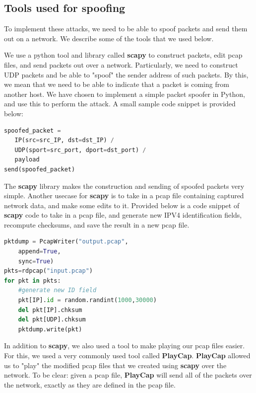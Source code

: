 \documentclass[conference]{IEEEtran}
\begin{document}
\subsection{Tools used for spoofing}
To implement these attacks, we need to be able to spoof packets and send them out on a network. We describe some of the tools that we used below.

We use a python tool and library called \textbf{scapy} to construct packets, edit pcap files, and send packets out over a network. 
Particularly, we  need to construct UDP packets and be able to "spoof" the sender address of such packets.
By this, we mean that we need to be able to indicate that a packet is coming from another host.
We have chosen to implement a simple packet spoofer in Python, and use this to perform the attack.
A small sample code snippet is provided below:
\vspace{0.3cm}
\begin{lstlisting}[language=Python]
spoofed_packet = 
   IP(src=src_IP, dst=dst_IP) / 
   UDP(sport=src_port, dport=dst_port) / 
   payload
send(spoofed_packet)
\end{lstlisting}
\vspace{0.3cm}
The \textbf{scapy} library makes the construction and sending of spoofed packets very simple.
Another usecase for \textbf{scapy} is to take in a pcap file containing captured network data, and make some edits to it.
Provided below is a code snippet of \textbf{scapy} code to take in a pcap file, and generate new IPV4 identification fields, recompute checksums, and save the result in a new pcap file.
\vspace{0.3cm}
\begin{lstlisting}[language=Python]
pktdump = PcapWriter("output.pcap",
	append=True, 
	sync=True)
pkts=rdpcap("input.pcap")
for pkt in pkts:
	#generate new ID field
	pkt[IP].id = random.randint(1000,30000)  
	del pkt[IP].chksum
	del pkt[UDP].chksum
	pktdump.write(pkt)
\end{lstlisting}
\vspace{0.3cm}

In addition to \textbf{scapy}, we also used a tool to make playing our pcap files easier.
For this, we used a very commonly used tool called \textbf{PlayCap}. 
\textbf{PlayCap} allowed us to "play" the modified pcap files that we created using \textbf{scapy} over the network.
To be clear: given a pcap file, \textbf{PlayCap}  will send all of the packets over the network, exactly as they are defined in the pcap file.
\end{document}
